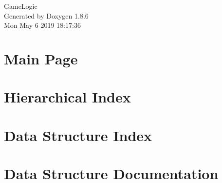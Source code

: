 \documentclass[twoside]{book}
\newcommand{\clearemptydoublepage}{%
  \newpage{\pagestyle{empty}\cleardoublepage}%
}
\begin{document}
\hypersetup{pageanchor=false}
\begin{titlepage}
\vspace*{7cm}
\begin{center}%
{\Large Game\-Logic }\\
\vspace*{1cm}
{\large Generated by Doxygen 1.8.6}\\
\vspace*{0.5cm}
{\small Mon May 6 2019 18:17:36}\\
\end{center}
\end{titlepage}
\clearemptydoublepage
\tableofcontents
\clearemptydoublepage
{}
\hypersetup{pageanchor=true}

\chapter{Main Page}
\label{index}\hypertarget{index}{}
\chapter{Hierarchical Index}

\chapter{Data Structure Index}

\chapter{Data Structure Documentation}




























\newpage
{}
{}
\printindex
\end{document}
